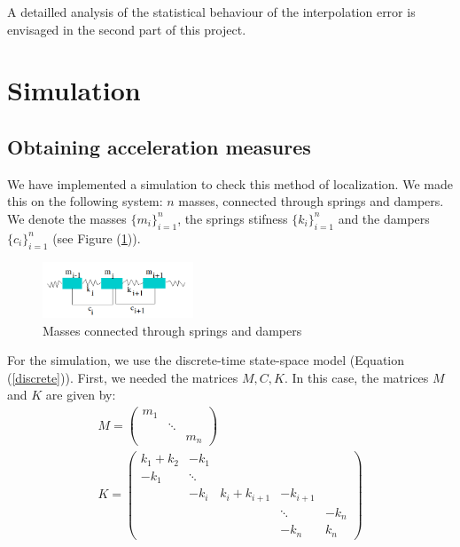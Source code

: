 \documentclass[journal]{IEEEtran}
\begin{document}
A detailled analysis of the statistical behaviour of the interpolation error is envisaged in the second part of this project.

\section{Simulation}

\subsection{Obtaining acceleration measures}

We have implemented a simulation to check this method of localization. We made this on the following system: $n$ masses, connected
through springs and dampers. We denote the masses $\{m_i\}_{i=1}^n$, the springs stifness $\{k_i\}_{i=1}^n$ and the dampers $\{c_i\}_{i=1}^n$ (see Figure (\ref{springs})).

\begin{figure}[h!]
  \centering
  \includegraphics[width=0.4\textwidth]{images/ressorts.png}
  \caption{Masses connected through springs and dampers}
  \label{springs}
\end{figure}

For the simulation, we use the discrete-time state-space model (Equation (\ref{discrete})). First, we needed the matrices $M, C, K$. In this case, the matrices $M$ and $K$ are given by:
\begin{equation}
\begin{array}{l}
M = 
\begin{pmatrix} 
m_1\\ 
&\ddots\\ 
&&m_n
\end{pmatrix} 
\\
K = 
\begin{pmatrix} 
k_1 + k_2 & - k_1 \\ 
- k_1 &\ddots\\ 
& -k_i & k_i + k_{i+1} & -k_{i+1} \\
&&&\ddots& -k_n\\
&&& -k_n & k_n
\end{pmatrix} 
\end{array}
\end{equation}
\end{document}
